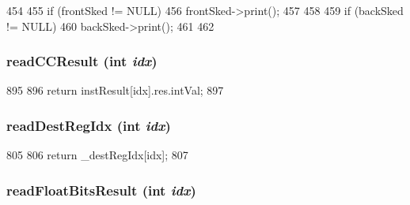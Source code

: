 \begin{DoxyCode}
454     {
455         if (frontSked != NULL) {
456             frontSked->print();
457         }
458 
459         if (backSked != NULL) {
460             backSked->print();
461         }
462     }
\end{DoxyCode}
\hypertarget{classInOrderDynInst_ab7e58b49a7e5605cecb289947ed601d9}{
\subsubsection[{readCCResult}]{ readCCResult (int {\em idx})}}
\label{classInOrderDynInst_ab7e58b49a7e5605cecb289947ed601d9}



\begin{DoxyCode}
895     {
896        return instResult[idx].res.intVal;
897     }
\end{DoxyCode}
\hypertarget{classInOrderDynInst_a6483def73c0dfa46ba34dc4ca72f19ce}{
\subsubsection[{readDestRegIdx}]{ readDestRegIdx (int {\em idx})}}
\label{classInOrderDynInst_a6483def73c0dfa46ba34dc4ca72f19ce}



\begin{DoxyCode}
805     {
806         return _destRegIdx[idx];
807     }
\end{DoxyCode}
\hypertarget{classInOrderDynInst_ae67b5a7b277039c37357545993f190f5}{
\subsubsection[{readFloatBitsResult}]{ readFloatBitsResult (int {\em idx})}}
\label{classInOrderDynInst_ae67b5a7b277039c37357545993f190f5}



